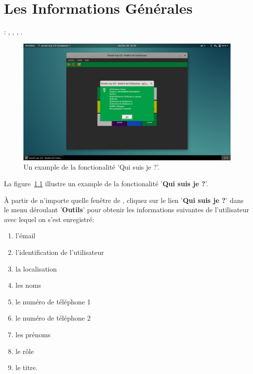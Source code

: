 \chapter{Les Informations G\'en\'erales}\label{chap:informations-generales}

\utilisateurs: \lienadmin, \liencaissier, \lienmagasinier, \lienmanager.\\



\begin{figure}[!htbp]
	\centering
	\includegraphics[scale=0.34]{images/yeren-qui-suis-je.png}
	\caption{Un example de la fonctionalit\'e 'Qui suis je ?'.}
	\label{fig:yeren-qui-suis-je}
\end{figure}

La figure~\ref{fig:yeren-qui-suis-je} illustre un example de
la fonctionalit\'e '\textbf{Qui suis je ?}'.

\`A partir de n'importe quelle fen\^etre de \yeroth, cliquez
sur le lien '\textbf{Qui suis je ?}' dans le menu d\'eroulant
'\textbf{Outils}' pour obtenir les informations suivantes
de l'utilisateur avec lequel on s'est enregistr\'e:

\begin{enumerate}[1)]
	\item l'\'email
	\item l'identification de l'utilisateur	
	\item la localisation
	\item les noms	
	\item le num\'ero de t\'el\'ephone 1
	\item le num\'ero de t\'el\'ephone 2	
	\item les pr\'enoms
	\item le r\^ole	
	\item le titre.
\end{enumerate}


